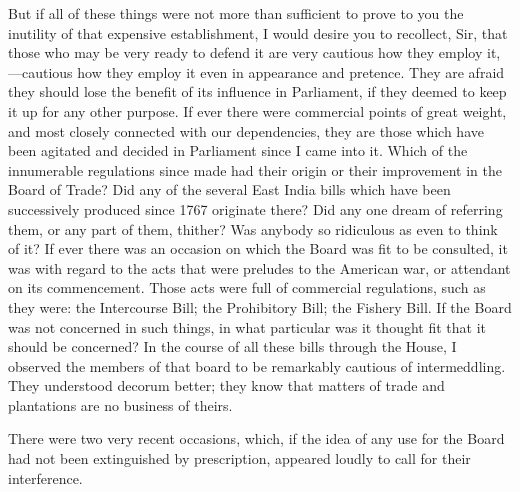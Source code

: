 But if all of these things were not more than sufficient to prove to you the inutility of that expensive establishment, I would desire you to recollect, Sir, that those who may be very ready to defend it are very cautious how they employ it,—cautious how they employ it even in appearance and pretence. They are afraid they should lose the benefit of its influence in Parliament, if they deemed to keep it up for any other purpose. If ever there were commercial points of great weight, and most closely connected with our dependencies, they are those which have been agitated and decided in Parliament since I came into it. Which of the innumerable regulations since made had their origin or their improvement in the Board of Trade? Did any of the several East India bills which have been successively produced since 1767 originate there? Did any one dream of referring them, or any part of them, thither? Was anybody so ridiculous as even to think of it? If ever there was an occasion on which the Board was fit to be consulted, it was with regard to the acts that were preludes to the American war, or attendant on its commencement. Those acts were full of commercial regulations, such as they were: the Intercourse Bill; the Prohibitory Bill; the Fishery Bill. If the Board was not concerned in such things, in what particular was it thought fit that it should be concerned? In the course of all these bills through the House, I observed the members of that board to be remarkably cautious of intermeddling. They understood decorum better; they know that matters of trade and plantations are no business of theirs.

There were two very recent occasions, which, if the idea of any use for the Board had not been extinguished by prescription, appeared loudly to call for their interference.

